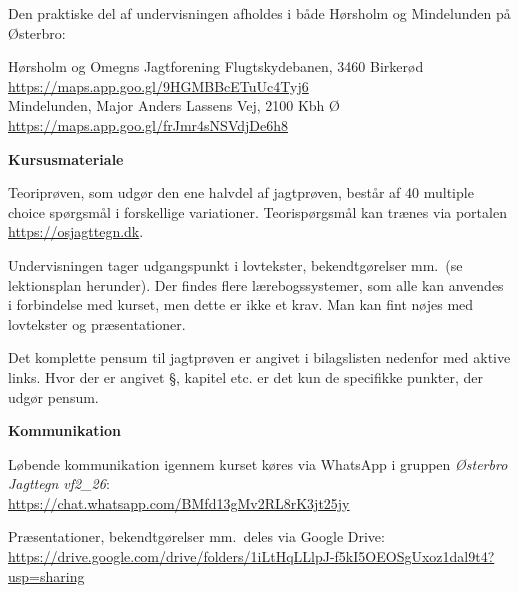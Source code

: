 \documentclass[10pt,a4paper]{article}
\begin{document}
\begin{flushleft}
\vspace{0.2cm}
Den praktiske del af undervisningen afholdes i både Hørsholm og Mindelunden på Østerbro:

\vspace{0.1cm}
\hspace{1em} Hørsholm og Omegns Jagtforening Flugtskydebanen, 3460 Birkerød\\
\hspace{1em} \url{https://maps.app.goo.gl/9HGMBBcETuUc4Tyj6}
\\
\vspace{0.2cm}
\hspace{1em} Mindelunden, Major Anders Lassens Vej, 2100 Kbh Ø\\
\hspace{1em} \url{https://maps.app.goo.gl/frJmr4sNSVdjDe6h8}

\vspace{0.4cm}
\textbf{Kursusmateriale}

\vspace{0.1cm}
Teoriprøven, som udgør den ene halvdel af jagtprøven, består af 40 multiple choice spørgsmål i forskellige variationer. Teorispørgsmål kan trænes via portalen \url{https://osjagttegn.dk}.

\vspace{0.2cm}
Undervisningen tager udgangspunkt i lovtekster, bekendtgørelser mm.\ (se lektionsplan herunder). Der findes flere lærebogssystemer, som alle kan anvendes i forbindelse med kurset, men dette er ikke et krav. Man kan fint nøjes med lovtekster og præsentationer.

\vspace{0.2cm}
Det komplette pensum til jagtprøven er angivet i bilagslisten nedenfor med aktive links. Hvor der er angivet §, kapitel etc. er det kun de specifikke punkter, der udgør pensum. 

\vspace{0.4cm}
\textbf{Kommunikation}

\vspace{0.1cm}
Løbende kommunikation igennem kurset køres via WhatsApp i gruppen \emph{Østerbro Jagttegn vf2\_26}:\\
\url{https://chat.whatsapp.com/BMfd13gMv2RL8rK3jt25jy}

\vspace{0.2cm}
Præsentationer, bekendtgørelser mm.\ deles via Google Drive:\\
\url{https://drive.google.com/drive/folders/1iLtHqLLlpJ-f5kI5OEOSgUxoz1dal9t4?usp=sharing}


\end{flushleft}
\end{document}
